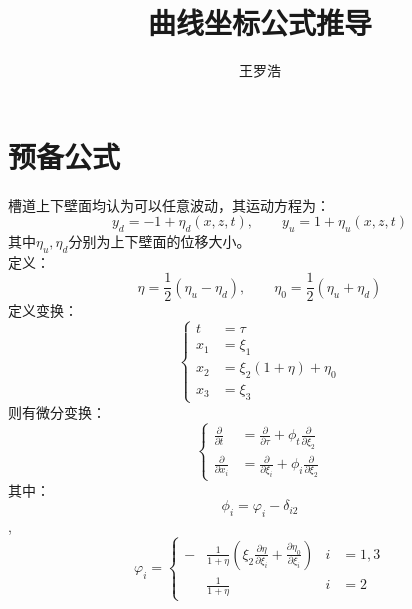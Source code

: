 \documentclass{ctexart}
\begin{document}
	\title{曲线坐标公式推导}
	\author{王罗浩}
	\date{}
	\maketitle
	\section{预备公式}
	\paragraph{}
	槽道上下壁面均认为可以任意波动，其运动方程为：
	\begin{equation}
	y_d = -1 + \eta_d(x, z, t), \qquad y_u = 1 + \eta_u(x, z, t)
	\end{equation}
	其中$\eta_u, \eta_d$分别为上下壁面的位移大小。\\
	定义：
	\begin{equation}
	\eta = \frac{1}{2}(\eta_u - \eta_d), \qquad \eta_0 = \frac{1}{2}(\eta_u + \eta_d)
	\end{equation}
	定义变换：
	\begin{equation}
	\left\{
	\begin{aligned}
	t &= \tau\\
	x_1 &= \xi_1\\
	x_2 &= \xi_2(1 + \eta)+\eta_0\\
	x_3 &= \xi_3
	\end{aligned}
	\right.
	\end{equation}
	则有微分变换：
	\begin{equation}
	\left\{
	\begin{aligned}
	\frac{\partial}{\partial t} &= \frac{\partial}{\partial \tau} + \phi_t\frac{\partial}{\partial\xi_2}\\
	\frac{\partial}{\partial x_i} &=
	\frac{\partial}{\partial\xi_i} + \phi_i\frac{\partial}{\partial\xi_2}
	\end{aligned}
	\right.
	\end{equation}
	其中：
	\begin{equation}
	\phi_i = \varphi_i - \delta_{i2}
	\end{equation},
	\begin{equation}
	\varphi_i=\left\{
	\begin{aligned}
	-&\frac{1}{1+\eta}(\xi_2\frac{\partial\eta}{\partial\xi_i}+\frac{\partial\eta_0}{\partial\xi_i}) &i&=1,3\\
	&\frac{1}{1+\eta} &i&=2
	\end{aligned}
	\right.
	\end{equation}
\end{document}
